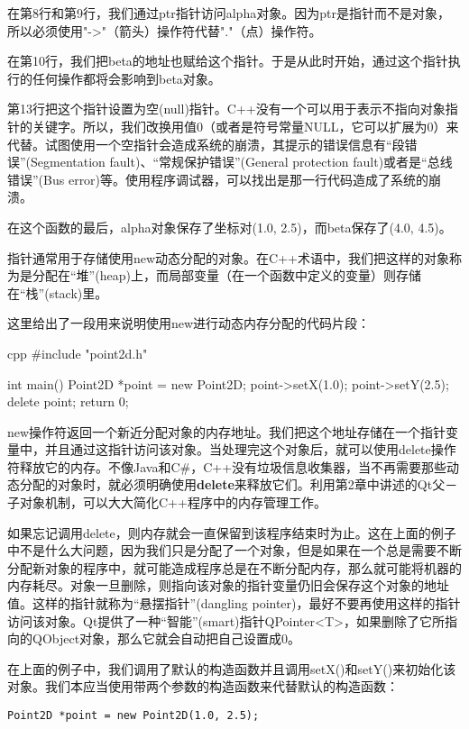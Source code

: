 \documentclass[11pt,oneside]{book}
\begin{document}
\begin{common-format}
在第8行和第9行，我们通过ptr指针访问alpha对象。因为ptr是指针而不是对象，所以必须使用"->"（箭头）操作符代替"."（点）操作符。

在第10行，我们把beta的地址也赋给这个指针。于是从此时开始，通过这个指针执行的任何操作都将会影响到beta对象。 

第13行把这个指针设置为空(null)指针。C++没有一个可以用于表示不指向对象指针的关键字。所以，我们改换用值0（或者是符号常量NULL，它可以扩展为0）来代替。试图使用一个空指针会造成系统的崩溃，其提示的错误信息有“段错误”(Segmentation fault)、“常规保护错误”(General protection fault)或者是“总线错误”(Bus error)等。使用程序调试器，可以找出是那一行代码造成了系统的崩溃。 

在这个函数的最后，alpha对象保存了坐标对(1.0, 2.5)，而beta保存了(4.0, 4.5)。

指针通常用于存储使用new动态分配的对象。在C++术语中，我们把这样的对象称为是分配在“堆”(heap)上，而局部变量（在一个函数中定义的变量）则存储在“栈”(stack)里。

这里给出了一段用来说明使用new进行动态内存分配的代码片段：
\begin{tcbcode}[]{cpp}
#include "point2d.h"

int main(){
    Point2D *point = new Point2D;
    point->setX(1.0);
    point->setY(2.5);
    delete point;
    return 0;
}
\end{tcbcode}

new操作符返回一个新近分配对象的内存地址。我们把这个地址存储在一个指针变量中，并且通过这指针访问该对象。当处理完这个对象后，就可以使用delete操作符释放它的内存。不像Java和C\#{}，C++没有垃圾信息收集器，当不再需要那些动态分配的对象时，就必须明确使用\textbf{delete}来释放它们。利用第2章中讲述的Qt父－子对象机制，可以大大简化C++程序中的内存管理工作。

如果忘记调用delete，则内存就会一直保留到该程序结束时为止。这在上面的例子中不是什么大问题，因为我们只是分配了一个对象，但是如果在一个总是需要不断分配新对象的程序中，就可能造成程序总是在不断分配内存，那么就可能将机器的内存耗尽。对象一旦删除，则指向该对象的指针变量仍旧会保存这个对象的地址值。这样的指针就称为“悬摆指针”(dangling pointer)，最好不要再使用这样的指针访问该对象。Qt提供了一种“智能”(smart)指针QPointer<T>，如果删除了它所指向的QObject对象，那么它就会自动把自己设置成0。

在上面的例子中，我们调用了默认的构造函数并且调用setX()和setY()来初始化该对象。我们本应当使用带两个参数的构造函数来代替默认的构造函数：
\begin{Verbatim}
Point2D *point = new Point2D(1.0, 2.5);
\end{Verbatim}


\end{common-format}
\end{document}
